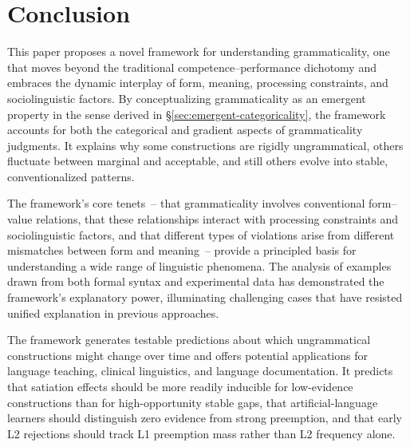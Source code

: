 \documentclass[12pt,letterpaper]{article}
\begin{document}


\section{Conclusion}

This paper proposes a novel framework for understanding grammaticality, one that moves beyond the traditional competence--performance dichotomy and embraces the dynamic interplay of form, meaning, processing constraints, and sociolinguistic factors. By conceptualizing grammaticality as an emergent property in the sense derived in \S\ref{sec:emergent-categoricality}, the framework accounts for both the categorical and gradient aspects of grammaticality judgments. It explains why some constructions are rigidly ungrammatical, others fluctuate between marginal and acceptable, and still others evolve into stable, conventionalized patterns.

The framework's core tenets~-- that grammaticality involves conventional form--value relations, that these relationships interact with processing constraints and sociolinguistic factors, and that different types of violations arise from different mismatches between form and meaning~-- provide a principled basis for understanding a wide range of linguistic phenomena. The analysis of examples drawn from both formal syntax and experimental data has demonstrated the framework's explanatory power, illuminating challenging cases that have resisted unified explanation in previous approaches.

The framework generates testable predictions about which ungrammatical constructions might change over time and offers potential applications for language teaching, clinical linguistics, and language documentation. It predicts that satiation effects should be more readily inducible for low-evidence constructions than for high-opportunity stable gaps, that artificial-language learners should distinguish zero evidence from strong preemption, and that early L2 rejections should track L1 preemption mass rather than L2 frequency alone.
\end{document}
